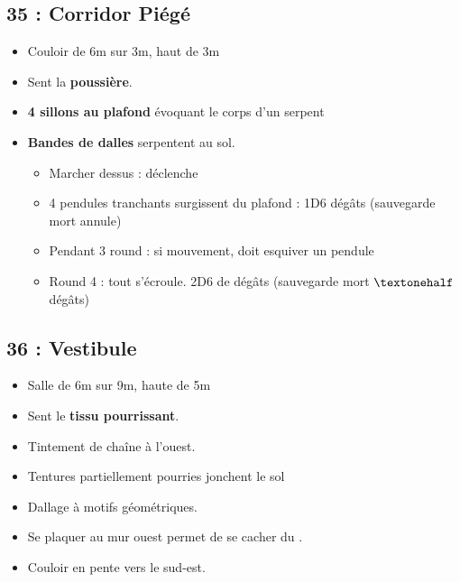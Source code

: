 \subsection{35 : Corridor Piégé}\label{n3:s35}
\begin{itemize}
  \item Couloir de 6m sur 3m, haut de 3m
  \item Sent la \textbf{poussière}.
  \item \textbf{4 sillons au plafond} évoquant le corps d’un serpent
  \item \textbf{Bandes de dalles} serpentent au sol.
  \begin{itemize}
    \item Marcher dessus : déclenche
    \item 4 pendules tranchants surgissent du plafond : 1D6 dégâts (sauvegarde mort annule)
    \item Pendant 3 round : si mouvement, doit esquiver un pendule
    \item Round 4 : tout s'écroule. 2D6 de dégâts (sauvegarde mort $\textonehalf$ dégâts)
  \end{itemize}
\end{itemize}


\subsection{36 : Vestibule}\label{n3:s36}
\begin{itemize}
  \item Salle de 6m sur 9m, haute de 5m
  \item Sent le \textbf{tissu pourrissant}.
  \item Tintement de chaîne à l’ouest.
  \item Tentures partiellement pourries jonchent le sol
  \item Dallage à motifs géométriques. 
  \item Se plaquer au mur ouest permet de se cacher du \textbf{}.
  \item Couloir en pente vers le sud-est.
\end{itemize}

